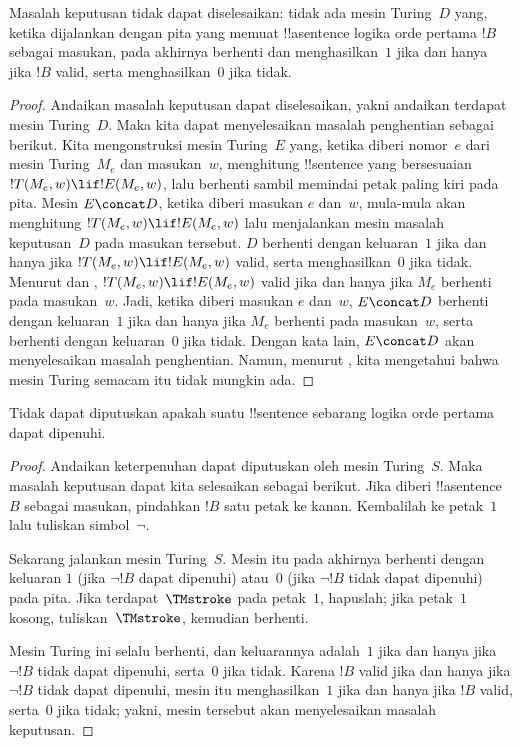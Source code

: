 \documentclass[../../../include/open-logic-section]{subfiles}
\begin{document}

\begin{thm}
Masalah keputusan tidak dapat diselesaikan: tidak ada mesin Turing~$D$ yang,
ketika dijalankan dengan pita yang memuat !!a{sentence} logika orde pertama
$!B$ sebagai masukan, pada akhirnya berhenti dan menghasilkan~$1$ jika dan
hanya jika $!B$ valid, serta menghasilkan~$0$ jika tidak.
\end{thm}

\begin{proof}
Andaikan masalah keputusan dapat diselesaikan, yakni andaikan terdapat mesin
Turing~$D$. Maka kita dapat menyelesaikan masalah penghentian sebagai berikut.
Kita mengonstruksi mesin Turing~$E$ yang, ketika diberi nomor~$e$ dari mesin
Turing~$M_e$ dan masukan~$w$, menghitung !!{sentence} yang bersesuaian
$!T(M_e, w) \lif !E(M_e, w)$, lalu berhenti sambil memindai petak paling kiri
pada pita. Mesin $E \concat D$, ketika diberi masukan $e$ dan~$w$, mula-mula
akan menghitung $!T(M_e, w) \lif !E(M_e, w)$ lalu menjalankan mesin masalah
keputusan~$D$ pada masukan tersebut. $D$ berhenti dengan keluaran~$1$ jika dan
hanya jika $!T(M_e, w) \lif !E(M_e, w)$ valid, serta menghasilkan~$0$ jika
tidak. Menurut  dan
, $!T(M_e, w) \lif !E(M_e, w)$ valid jika dan
hanya jika $M_e$ berhenti pada masukan~$w$. Jadi, ketika diberi masukan $e$
dan~$w$, $E\concat D$ berhenti dengan keluaran~$1$ jika dan hanya jika $M_e$
berhenti pada masukan~$w$, serta berhenti dengan keluaran~$0$ jika tidak.
Dengan kata lain, $E \concat D$ akan menyelesaikan masalah penghentian.
Namun, menurut , kita mengetahui bahwa mesin
Turing semacam itu tidak mungkin ada.
\end{proof}

\begin{cor}%
Tidak dapat diputuskan apakah suatu !!{sentence} sebarang logika orde pertama
dapat dipenuhi.
\end{cor}

\begin{proof}
  Andaikan keterpenuhan dapat diputuskan oleh mesin Turing~$S$. Maka masalah
  keputusan dapat kita selesaikan sebagai berikut. Jika diberi
  !!a{sentence}~$B$ sebagai masukan, pindahkan $!B$ satu petak ke kanan.
  Kembalilah ke petak~$1$ lalu tuliskan simbol~$\lnot$.

  Sekarang jalankan mesin Turing~$S$. Mesin itu pada akhirnya berhenti dengan
  keluaran $1$ (jika $\lnot !B$ dapat dipenuhi) atau~$0$ (jika $\lnot !B$
  tidak dapat dipenuhi) pada pita. Jika terdapat~$\TMstroke$ pada petak~$1$,
  hapuslah; jika petak~$1$ kosong, tuliskan~$\TMstroke$, kemudian berhenti.

  Mesin Turing ini selalu berhenti, dan keluarannya adalah~$1$ jika dan hanya
  jika $\lnot !B$ tidak dapat dipenuhi, serta~$0$ jika tidak. Karena $!B$
  valid jika dan hanya jika $\lnot !B$ tidak dapat dipenuhi, mesin itu
  menghasilkan~$1$ jika dan hanya jika $!B$ valid, serta~$0$ jika tidak;
  yakni, mesin tersebut akan menyelesaikan masalah keputusan.
\end{proof}
\end{document}
